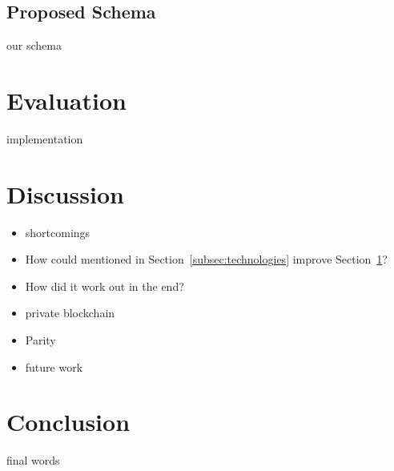 \documentclass[runningheads]{llncs}
\newcommand{\refsec}[1]{Section~\ref{#1}}
\begin{document}
\subsection{Proposed Schema} \label{subsec:schema}

our schema


\section{Evaluation} \label{sec:eval}

implementation


\section{Discussion} \label{sec:discussion}

\begin{itemize}
    \item shortcomings
    \item How could mentioned in \refsec{subsec:technologies} improve \refsec{sec:eval}?
    \item How did it work out in the end? 
    \item private blockchain
    \item Parity
    \item future work
\end{itemize}


\section{Conclusion} \label{sec:conclusion}

final words




\end{document}
